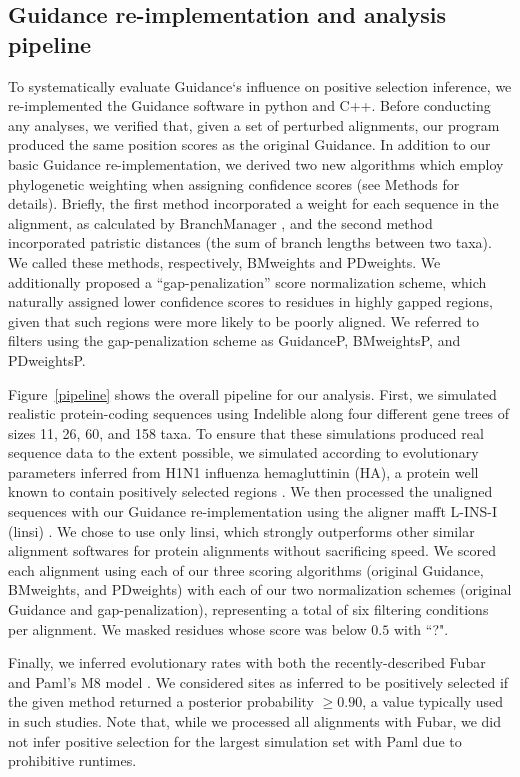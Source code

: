 \documentclass[10pt]{article}
\begin{document}
\subsection*{Guidance re-implementation and analysis pipeline}
To systematically evaluate Guidance`s influence on positive selection inference, we re-implemented the Guidance software in python and C++. Before conducting any analyses, we verified that, given a set of perturbed alignments, our program produced the same position scores as the original Guidance. In addition to our basic Guidance re-implementation, we derived two new algorithms which employ phylogenetic weighting when assigning confidence scores (see Methods for details).  Briefly, the first method incorporated a weight for each sequence in the alignment, as calculated by BranchManager \citep{Stone2007}, and the second method incorporated patristic distances (the sum of branch lengths between two taxa). We called these methods, respectively, BMweights and PDweights.  We additionally proposed a ``gap-penalization” score normalization scheme, which naturally assigned lower confidence scores to residues in highly gapped regions, given that such regions were more likely to be poorly aligned. We referred to filters using the gap-penalization scheme as GuidanceP, BMweightsP, and PDweightsP.

Figure~\ref{pipeline} shows the overall pipeline for our analysis. First, we simulated realistic protein-coding sequences using Indelible \citep{Fletcher2009} along four different gene trees of sizes 11, 26, 60, and 158 taxa. To ensure that these simulations produced real sequence data to the extent possible, we simulated according to evolutionary parameters inferred from H1N1 influenza hemagluttinin (HA), a protein well known to contain positively selected regions \citep{Meyer2012}. We then processed the unaligned sequences with our Guidance re-implementation using the aligner mafft L-INS-I (linsi) \citep{Katoh2005}. We chose to use only linsi, which strongly outperforms other similar alignment softwares for protein alignments \citep{Thompson2011,Nuin2006}without sacrificing speed. We scored each alignment using each of our three scoring algorithms (original Guidance, BMweights, and PDweights) with each of our two normalization schemes (original Guidance and gap-penalization), representing a total of six filtering conditions per alignment. We masked residues whose score was below $0.5$ with ``?".  

Finally, we inferred evolutionary rates with both the recently-described Fubar \citep{Murrell2013} and Paml's M8 model \citep{Yang2007}. We considered sites as inferred to be positively selected if the given method returned a posterior probability $\geq0.90$, a value typically used in such studies. Note that, while we processed all alignments with Fubar, we did not infer positive selection for the largest simulation set with Paml due to prohibitive runtimes. 
\end{document}
